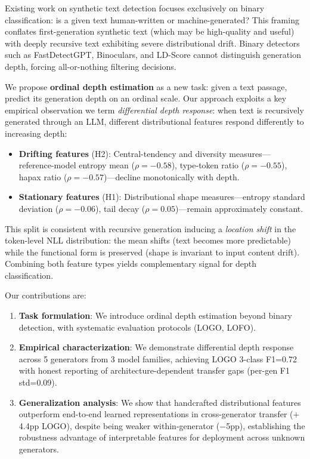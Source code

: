 \documentclass[11pt,a4paper]{article}
\begin{document}
Existing work on synthetic text detection focuses exclusively on binary classification: is a given text human-written or machine-generated? This framing conflates first-generation synthetic text (which may be high-quality and useful) with deeply recursive text exhibiting severe distributional drift. Binary detectors such as FastDetectGPT, Binoculars, and LD-Score cannot distinguish generation depth, forcing all-or-nothing filtering decisions.

We propose \textbf{ordinal depth estimation} as a new task: given a text passage, predict its generation depth on an ordinal scale. Our approach exploits a key empirical observation we term \emph{differential depth response}: when text is recursively generated through an LLM, different distributional features respond differently to increasing depth:
\begin{itemize}
    \item \textbf{Drifting features} (H2): Central-tendency and diversity measures---reference-model entropy mean ($\rho{=}{-}0.58$), type-token ratio ($\rho{=}{-}0.55$), hapax ratio ($\rho{=}{-}0.57$)---decline monotonically with depth.
    \item \textbf{Stationary features} (H1): Distributional shape measures---entropy standard deviation ($\rho{=}{-}0.06$), tail decay ($\rho{=}0.05$)---remain approximately constant.
\end{itemize}

This split is consistent with recursive generation inducing a \emph{location shift} in the token-level NLL distribution: the mean shifts (text becomes more predictable) while the functional form is preserved (shape is invariant to input content drift). Combining both feature types yields complementary signal for depth classification.

Our contributions are:
\begin{enumerate}
    \item \textbf{Task formulation}: We introduce ordinal depth estimation beyond binary detection, with systematic evaluation protocols (LOGO, LOFO).
    \item \textbf{Empirical characterization}: We demonstrate differential depth response across 5 generators from 3 model families, achieving LOGO 3-class F1=0.72 with honest reporting of architecture-dependent transfer gaps (per-gen F1 std=0.09).
    \item \textbf{Generalization analysis}: We show that handcrafted distributional features outperform end-to-end learned representations in cross-generator transfer ($+$4.4pp LOGO), despite being weaker within-generator ($-$5pp), establishing the robustness advantage of interpretable features for deployment across unknown generators.
\end{enumerate}
\end{document}
